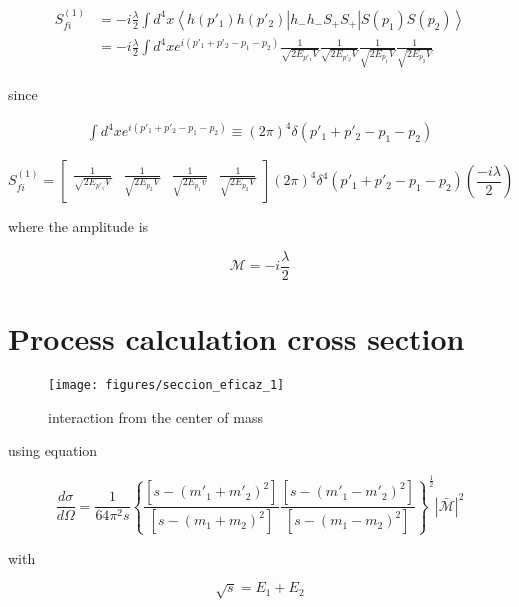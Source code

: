 \begin{equation}
  \begin{split}
    S_{fi}^{(1)} &= -i \frac{\lambda}{2} \int{ d^4x \left \langle h(p'_1) h(p'_2)| h_- h_- S_+ S_+ | S(p_1) S(p_2) \right \rangle }\\
    &=-i \frac{\lambda}{2} \int{ d^4x e^{i(p'_1+p'_2-p_1-p_2)} \frac{1}{\sqrt{2E_{p'_1}V}} \frac{1}{\sqrt{2E_{p'_2}V}} \frac{1}{\sqrt{2E_{p_1}V}} \frac{1}{\sqrt{2E_{p_2}V}} } 
  \end{split}
\end{equation}

since

\begin{align}
  \int{ d^4 x e^{i(p'_1+p'_2-p_1-p_2)} \equiv {(2 \pi)}^4 \delta (p'_1 + p'_2 - p_1 - p_2)}
\end{align}

\begin{equation}
  S_{fi}^{(1)} = \begin{bmatrix}\frac{1}{\sqrt{2E_{p'_1}V}} & \frac{1}{\sqrt{2E_{p_2}V}} & \frac{1}{\sqrt{2E_{p_1}v}} & \frac{1}{\sqrt{2E_{p_2}V}} \end{bmatrix} (2\pi)^4 \delta^4 (p'_1 + p'_2 - p_1 - p_2) \left( \frac{-i\lambda}{2} \right)
\end{equation}

where the amplitude is

\begin{equation}
  \mathcal{M} = -i \frac{\lambda}{2}
\end{equation}

\section{Process calculation cross section}

\begin{figure}
  \centering
  \texttt{[image: figures/seccion\_eficaz\_1]}
  \caption{interaction from the center of mass}
\end{figure}

using equation

\begin{equation}
  \frac{d\sigma}{d\Omega} = \frac{1}{64 \pi^2 s} \left\{ \frac{ [s-(m'_1 +m'_2)^2]}{[s-(m_1 + m_2)^2]} \frac{[s-(m'_1 - m'_2)^2 ]}{[s-(m_1 -m_2)^2]} \right\}^{\frac{1}{2}} | \bar{\mathcal{M}} |^2  
\end{equation}

with

\begin{equation}
  \sqrt{s} = E_1 + E_2
\end{equation}

